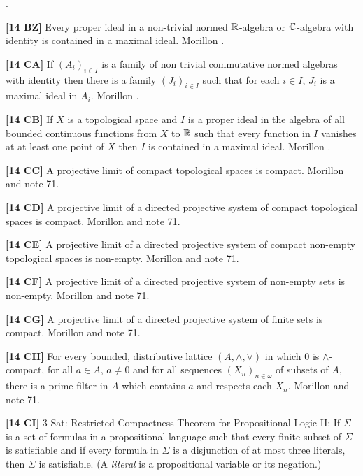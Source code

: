 \cite{1988}.
\smallskip
\item{}{\bf [14 BZ]} Every proper ideal in a non-trivial normed
$\Bbb R$-algebra or $\Bbb C$-algebra with identity is contained in a
maximal ideal. \ac{Morillon} \cite{1988}.
\smallskip
\item{}{\bf [14 CA]} If $(A_i)_{i\in I}$ is a family of non trivial
commutative normed algebras with identity then there is a family
$(J_i)_{i\in I}$ such that for each $i\in I$, $J_i$ is a maximal
ideal in $A_i$.  \ac{Morillon} \cite{1988}.
\smallskip
\item{}{\bf [14 CB]} If $X$ is a topological space and $I$ is a proper ideal
in the algebra of all bounded continuous functions from $X$ to $\Bbb R$
such that every function in $I$ vanishes at at least one point of $X$
then $I$ is contained in a maximal ideal.  \ac{Morillon} \cite{1988}.
\smallskip
\item{}{\bf [14 CC]} A projective limit of compact topological spaces is
compact.  \ac{Morillon} \cite{1988} and note 71.
\smallskip
\item{}{\bf [14 CD]} A projective limit of a directed projective system of
compact topological spaces is compact.  \ac{Morillon} \cite{1988} and
note 71.
\smallskip
\item{}{\bf [14 CE]} A projective limit of a directed projective system of
compact non-empty topological spaces is non-empty.  \ac{Morillon}
\cite{1988} and note 71.
\smallskip
\item{}{\bf [14 CF]} A projective limit of a directed projective system of
non-empty sets is non-empty.  \ac{Morillon} \cite{1988} and note 71.
\smallskip
\item{}{\bf [14 CG]} A projective limit of a directed projective system of
finite sets is compact.  \ac{Morillon} \cite{1988} and note 71.
\smallskip
\item{}{\bf [14 CH]} For every bounded, distributive lattice
$(A,\land,\lor)$ in which $0$ is $\land$-compact, for all $a\in A$,
$a\ne 0$ and for all sequences $(X_n)_{n\in\omega}$ of subsets
of $A$, there is a prime filter in $A$ which contains $a$ and respects
each $X_n$.  \ac{Morillon} \cite{1988} and note 71.
\smallskip
\item{}{\bf [14 CI]} 3-Sat:  Restricted Compactness Theorem for
Propositional Logic II:   If $\Sigma$ is a set of formulas in a
propositional language such that every finite subset of $\Sigma$
is satisfiable and if every formula in $\Sigma$ is a disjunction
of at most three literals, then $\Sigma$ is satisfiable.
(A {\it literal} is a propositional variable or its negation.)
